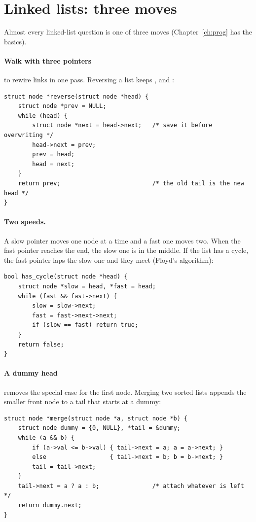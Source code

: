 \section{Linked lists: three moves}

Almost every linked-list question is one of three moves (Chapter~\ref{ch:prog} has the basics).

\paragraph{Walk with three pointers} to rewire links in one pass. Reversing a list keeps ,  and :

\begin{lstlisting}
struct node *reverse(struct node *head) {
    struct node *prev = NULL;
    while (head) {
        struct node *next = head->next;   /* save it before overwriting */
        head->next = prev;
        prev = head;
        head = next;
    }
    return prev;                          /* the old tail is the new head */
}
\end{lstlisting}

\paragraph{Two speeds.} A slow pointer moves one node at a time and a fast one moves two. When the fast pointer reaches the end, the slow one is in the middle. If the list has a cycle, the fast pointer laps the slow one and they meet (Floyd's algorithm):

\begin{lstlisting}
bool has_cycle(struct node *head) {
    struct node *slow = head, *fast = head;
    while (fast && fast->next) {
        slow = slow->next;
        fast = fast->next->next;
        if (slow == fast) return true;
    }
    return false;
}
\end{lstlisting}

\paragraph{A dummy head} removes the special case for the first node. Merging two sorted lists appends the smaller front node to a tail that starts at a dummy:

\begin{lstlisting}
struct node *merge(struct node *a, struct node *b) {
    struct node dummy = {0, NULL}, *tail = &dummy;
    while (a && b) {
        if (a->val <= b->val) { tail->next = a; a = a->next; }
        else                  { tail->next = b; b = b->next; }
        tail = tail->next;
    }
    tail->next = a ? a : b;               /* attach whatever is left */
    return dummy.next;
}
\end{lstlisting}

